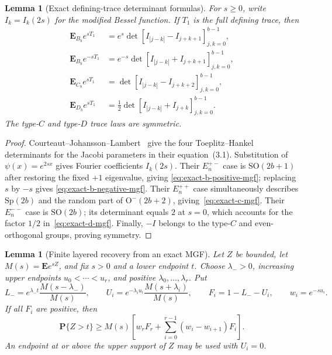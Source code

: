 \documentclass[11pt,reqno]{amsart}
\theoremstyle{plain}
\newtheorem{lemma}[theorem]{Lemma}
\theoremstyle{definition}
\begin{document}
\begin{lemma}[Exact defining-trace determinant formulas]
\label{lem:exact-defining-trace-determinants}
For $s\geq0$, write $I_k=I_k(2s)$ for the modified Bessel function.  If
$T_1$ is the full defining trace, then
\begin{align}
 \mathbf E_{B_b}e^{sT_1}
 &=e^s\det[I_{|j-k|}-I_{j+k+1}]_{j,k=0}^{b-1},
 \label{eq:exact-b-positive-mgf}\\
 \mathbf E_{B_b}e^{-sT_1}
 &=e^{-s}\det[I_{|j-k|}+I_{j+k+1}]_{j,k=0}^{b-1},
 \label{eq:exact-b-negative-mgf}\\
 \mathbf E_{C_b}e^{sT_1}
 &=\det[I_{|j-k|}-I_{j+k+2}]_{j,k=0}^{b-1},
 \label{eq:exact-c-mgf}\\
 \mathbf E_{D_b}e^{sT_1}
 &=\frac12\det[I_{|j-k|}+I_{j+k}]_{j,k=0}^{b-1}.
 \label{eq:exact-d-mgf}
\end{align}
The type-$C$ and type-$D$ trace laws are symmetric.
\end{lemma}

\begin{proof}
Courteaut--Johansson--Lambert~\cite[Lemma~3.1]{CJL2022} give the four
Toeplitz--Hankel determinants for the Jacobi parameters in their
equation~(3.1).  Substitution of $\psi(x)=e^{2sx}$ gives Fourier
coefficients $I_k(2s)$.  Their $E_n^{+-}$ case is
$\mathrm{SO}(2b+1)$ after restoring the fixed $+1$ eigenvalue, giving
\eqref{eq:exact-b-positive-mgf}; replacing $s$ by $-s$ gives
\eqref{eq:exact-b-negative-mgf}.  Their $E_n^{++}$ case simultaneously
describes $\mathrm{Sp}(2b)$ and the random part of
$\mathrm O^-(2b+2)$, giving~\eqref{eq:exact-c-mgf}.  Their $E_n^{--}$
case is $\mathrm{SO}(2b)$; its determinant equals $2$ at $s=0$, which
accounts for the factor $1/2$ in~\eqref{eq:exact-d-mgf}.  Finally,
$-I$ belongs to the type-$C$ and even-orthogonal groups, proving symmetry.
\end{proof}

\begin{lemma}[Finite layered recovery from an exact MGF]
\label{lem:finite-layered-mgf-recovery}
Let $Z$ be bounded, let $M(s)=\mathbf Ee^{sZ}$, and fix $s>0$ and a lower
endpoint $t$.  Choose $\lambda_->0$, increasing upper endpoints
$u_0<\cdots<u_r$, and positive $\lambda_0,\ldots,\lambda_r$.  Put
\[
 L_-=e^{\lambda_-t}\frac{M(s-\lambda_-)}{M(s)},
 \qquad
 U_i=e^{-\lambda_i u_i}\frac{M(s+\lambda_i)}{M(s)},
 \qquad F_i=1-L_--U_i,
 \qquad w_i=e^{-su_i}.
\]
If all $F_i$ are positive, then
\begin{equation}
\label{eq:finite-layered-mgf-recovery}
 \mathbf P\{Z>t\}\geq M(s)
 \left[w_rF_r+\sum_{i=0}^{r-1}(w_i-w_{i+1})F_i\right].
\end{equation}
An endpoint at or above the upper support of $Z$ may be used with $U_i=0$.
\end{lemma}
\end{document}
